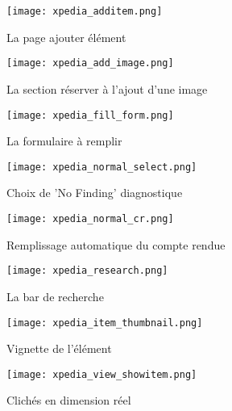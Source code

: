 \begin{figure}[H]
    \centering
    \texttt{[image: xpedia\_additem.png]}
    \caption{La page ajouter élément}\label{fig:xpedia_additem}
\end{figure}
\begin{figure}[H]
    \centering
    \texttt{[image: xpedia\_add\_image.png]}
    \caption{La section réserver à l'ajout d'une image}\label{fig:xpedia_add_image}
\end{figure}
\begin{figure}[H]
    \centering
    \texttt{[image: xpedia\_fill\_form.png]}
    \caption{La formulaire à remplir}\label{fig:xpedia_fill_form}
\end{figure}
\begin{figure}[H]
    \centering
    \texttt{[image: xpedia\_normal\_select.png]}
    \caption{Choix de 'No Finding' diagnostique}\label{fig:nofinding_choice}
\end{figure}
\begin{figure}[H]
    \centering
    \texttt{[image: xpedia\_normal\_cr.png]}
    \caption{Remplissage automatique du compte rendue}\label{fig:xpedia_normal_cr}
\end{figure}
\begin{figure}[H]
    \centering
    \texttt{[image: xpedia\_research.png]}
    \caption{La bar de recherche}\label{fig:xpedia_research}
\end{figure}

\begin{figure}[H]
    \centering
    \texttt{[image: xpedia\_item\_thumbnail.png]}
    \caption{Vignette de l'élément}\label{fig:xpedia_item_thumbnail}
\end{figure}
\begin{figure}[H]
    \centering
    \texttt{[image: xpedia\_view\_showitem.png]}
    \caption{Clichés en dimension réel}\label{fig:xpedia_view_showitem}
\end{figure}
